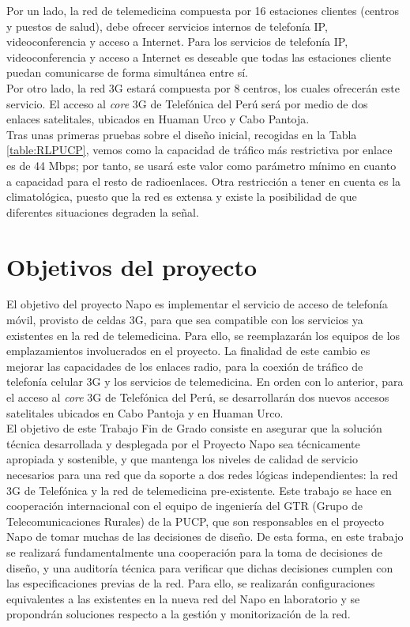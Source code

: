 	Por un lado, la red de telemedicina compuesta por 16 estaciones clientes (centros y puestos de salud), debe ofrecer servicios internos de telefonía IP, videoconferencia y acceso a Internet. Para los servicios de telefonía IP, videoconferencia y acceso a Internet es deseable que todas las estaciones cliente puedan comunicarse de forma simultánea entre sí.\\
		
	Por otro lado, la red 3G estará compuesta por 8 centros, los cuales ofrecerán este servicio. El acceso al \textit{core} 3G de Telefónica del Perú será por medio de dos enlaces satelitales, ubicados en Huaman Urco y Cabo Pantoja.\\
	
	Tras unas primeras pruebas sobre el diseño inicial, recogidas en la Tabla \ref{table:RLPUCP}, vemos como la capacidad de tráfico más restrictiva por enlace es de 44 Mbps; por tanto, se usará este valor como parámetro mínimo en cuanto a capacidad para el resto de radioenlaces. Otra restricción a tener en cuenta es la climatológica, puesto que la red es extensa y existe la posibilidad de que diferentes situaciones degraden la señal.
		
\section{Objetivos del proyecto}
	El objetivo del proyecto Napo es implementar el servicio de acceso de telefonía móvil, provisto de celdas 3G, para que sea compatible con los servicios ya existentes en la red de telemedicina. Para ello, se reemplazarán los equipos de los emplazamientos involucrados en el proyecto. La finalidad de este cambio es mejorar las capacidades de los enlaces radio, para la coexión de tráfico de telefonía celular 3G y los servicios de telemedicina. En orden con lo anterior, para el acceso al \textit{core} 3G de Telefónica del Perú, se desarrollarán dos nuevos accesos satelitales ubicados en Cabo Pantoja y en Huaman Urco.\\
	
	El objetivo de este Trabajo Fin de Grado consiste en asegurar que la solución técnica desarrollada y desplegada por el Proyecto Napo sea técnicamente apropiada y sostenible, y que mantenga los niveles de calidad de servicio necesarios para una red que da soporte a dos redes lógicas independientes: la red 3G de Telefónica y la red de telemedicina pre-existente. Este trabajo se hace en cooperación internacional con el equipo de ingeniería del GTR (Grupo de Telecomunicaciones Rurales) de la PUCP, que son responsables en el proyecto Napo de tomar muchas de las decisiones de diseño. De esta forma, en este trabajo se realizará fundamentalmente una cooperación para la toma de decisiones de diseño, y una auditoría técnica para verificar que dichas decisiones cumplen con las especificaciones previas de la red. Para ello, se realizarán configuraciones equivalentes a las existentes en la nueva red del Napo en laboratorio y se propondrán soluciones respecto a la gestión y monitorización de la red.
	 
